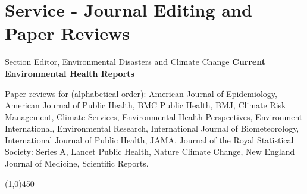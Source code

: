 \section*{Service - Journal Editing and Paper Reviews}

\noindent Section Editor, Environmental Disasters and Climate Change \hfill \textbf{Current Environmental Health Reports} \medskip

\noindent Paper reviews for (alphabetical order): American Journal of Epidemiology, American Journal of Public Health, BMC Public Health, BMJ, Climate Risk Management, Climate Services, Environmental Health Perspectives, Environment International, Environmental Research, International Journal of Biometeorology, International Journal of Public Health, JAMA, Journal of the Royal Statistical Society: Series A, Lancet Public Health, Nature Climate Change, New England Journal of Medicine, Scientific Reports.

\begin{center} \line(1,0){450} \end{center}